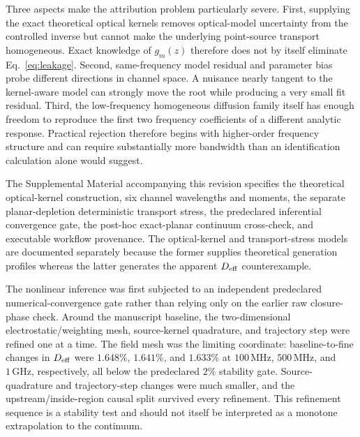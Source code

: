 \documentclass[aps,pra,twocolumn,superscriptaddress,nofootinbib]{revtex4-2}
\begin{document}
Three aspects make the attribution problem particularly severe. First, supplying the exact theoretical optical kernels removes optical-model uncertainty from the controlled inverse but cannot make the underlying point-source transport homogeneous. Exact knowledge of $g_m(z)$ therefore does not by itself eliminate Eq.~\eqref{eq:leakage}. Second, same-frequency model residual and parameter bias probe different directions in channel space. A nuisance nearly tangent to the kernel-aware model can strongly move the root while producing a very small fit residual. Third, the low-frequency homogeneous diffusion family itself has enough freedom to reproduce the first two frequency coefficients of a different analytic response. Practical rejection therefore begins with higher-order frequency structure and can require substantially more bandwidth than an identification calculation alone would suggest.

The Supplemental Material accompanying this revision specifies the theoretical optical-kernel construction, six channel wavelengths and moments, the separate planar-depletion deterministic transport stress, the predeclared inferential convergence gate, the post-hoc exact-planar continuum cross-check, and executable workflow provenance.  The optical-kernel and transport-stress models are documented separately because the former supplies theoretical generation profiles whereas the latter generates the apparent $D_{\rm eff}$ counterexample.

The nonlinear inference was first subjected to an independent predeclared numerical-convergence gate rather than relying only on the earlier raw closure-phase check.  Around the manuscript baseline, the two-dimensional electrostatic/weighting mesh, source-kernel quadrature, and trajectory step were refined one at a time.  The field mesh was the limiting coordinate: baseline-to-fine changes in $D_{\rm eff}$ were $1.648\%$, $1.641\%$, and $1.633\%$ at $100\,\mathrm{MHz}$, $500\,\mathrm{MHz}$, and $1\,\mathrm{GHz}$, respectively, all below the predeclared $2\%$ stability gate.  Source-quadrature and trajectory-step changes were much smaller, and the upstream/inside-region causal split survived every refinement.  This refinement sequence is a stability test and should not itself be interpreted as a monotone extrapolation to the continuum.
\end{document}
